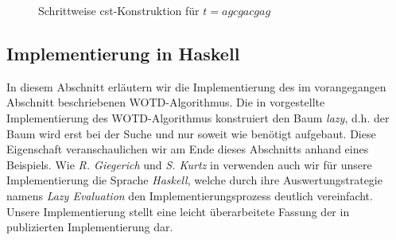 \documentclass[12pt]{report}
\begin{document}
\begin{figure}[h]
\caption{Schrittweise cst-Konstruktion für $t = agcgacgag$}
\label{fig:cstKonstruktion}
\end{figure}

\subsection{Implementierung in Haskell}
\label{sec:ImplementierungInHaskell}

In diesem Abschnitt erläutern wir die Implementierung des im vorangegangen Abschnitt beschriebenen WOTD-Algorithmus. Die in \cite{Giegerich1995} vorgestellte Implementierung des WOTD-Algorithmus konstruiert den Baum \textit{lazy}, d.h. der Baum wird erst bei der Suche und nur soweit wie benötigt aufgebaut. Diese Eigenschaft veranschaulichen wir am Ende dieses Abschnitts anhand eines Beispiels. Wie \textit{R. Giegerich} und \textit{S. Kurtz} in \cite{Giegerich1995} verwenden auch wir für unsere Implementierung die Sprache \textit{Haskell}, welche durch ihre Auswertungstrategie namens \textit{Lazy Evaluation} den Implementierungsprozess deutlich vereinfacht. Unsere Implementierung stellt eine leicht überarbeitete Fassung der in \cite{Giegerich1995} publizierten Implementierung dar.
\end{document}
